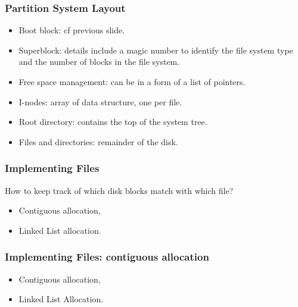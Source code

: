 \begin{frame}
  \frametitle{Partition System Layout}
    \begin{itemize}
      \item Boot block: cf previous slide.
      \item Superblock: details include a magic number to identify the file system type and the number of blocks in the file system.
      \item Free space management: can be in a form of a list of pointers.
      \item I-nodes: array of data structure, one per file.
      \item Root directory: contains the top of the system tree.
      \item Files and directories: remainder of the disk.
  \end{itemize}
\end{frame}

\begin{frame}
  \frametitle{Implementing Files}
  How to keep track of which disk blocks match with which file?
    \begin{itemize}
      \item Contiguous allocation,
      \item Linked List allocation.
  \end{itemize}
\end{frame}

\begin{frame}
  \frametitle{Implementing Files: contiguous allocation}
    \begin{itemize}
      \item Contiguous allocation,
      \item Linked List Allocation.
  \end{itemize}
\end{frame}
